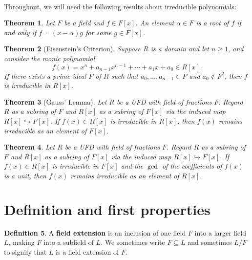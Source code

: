 \documentclass[12pt]{report}
\newtheorem{theorem}{Theorem}[chapter]
\numberwithin{equation}{section}
\numberwithin{theorem}{chapter}
\theoremstyle{definition}
\newtheorem{definition}[theorem]{Definition}
\newtheorem*{basic properties}{Basic Properties}
\newtheorem*{Important Remark}{Important Remark}
\newcommand{\df}[1]{{\bf #1}\index{#1}}
\begin{document}
\


Throughout, we will need the following results about irreducible polynomials:


\begin{theorem}
	Let $F$ be a field and $f \in F[x]$. An element $\alpha \in F$ is a root of $f$ if and only if $f = (x-\alpha) g$ for some $g \in F[x]$.
\end{theorem}

\begin{theorem}[Eisenstein's Criterion]\label{eisenstein criterion}
Suppose $R$ is a domain and let $n \geqslant 1$, and consider the monic polynomial
$$f(x) = x^n + a_{n-1} x^{n-1} + \cdots + a_1 x + a_0 \in R[x].$$
If there exists a prime ideal $P$ of $R$ such that $a_0, \dots, a_{n-1} \in P$ and $a_0 \notin P^2$, then $f$ is irreducible in $R[x]$.
\end{theorem}


\begin{theorem}[Gauss' Lemma]\label{Gauss Lemma}
Let $R$ be a UFD  with field of fractions $F$. Regard $R$ as a subring of $F$ and $R[x]$ as a subring of $F[x]$ via the induced map $R[x]\hookrightarrow F[x]$.
If $f(x) \in R[x]$ is irreducible  in $R[x]$,  then $f(x)$ remains irreducible  as an element of $F[x]$.
\end{theorem}

\begin{theorem}\label{gauss lemma backwards}
	Let $R$ be a UFD  with field of fractions $F$. Regard $R$ as a subring of $F$ and $R[x]$ as a subring of $F[x]$ via the induced map $R[x]\hookrightarrow F[x]$. If $f(x) \in R[x]$ is irreducible in $F[x]$ and the $\gcd$ of the coefficients of $f(x)$ is a unit, then $f(x)$ remains irreducible as an element of $R[x]$.
\end{theorem}





\section{Definition and first properties}


\begin{definition} 
A \df{field extension} is an inclusion of one field $F$ into a larger field $L$, making $F$ into a subfield of $L$. We sometimes write $F \subseteq L$ and sometimes $L/F$ to signify that $L$ is a field extension of $F$.
\end{definition}
\end{document}

